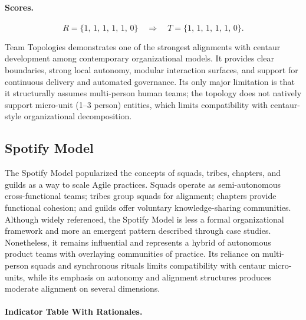 \documentclass[11pt, a4paper, twocolumn]{article} %
\begin{document}
\paragraph{Scores.}

\[
R = \{1,\,1,\,1,\,1,\,1,\,0\}
\quad\Rightarrow\quad
T = \{1,\,1,\,1,\,1,\,1,\,0\}.
\]

Team Topologies demonstrates one of the strongest alignments with centaur
development among contemporary organizational models. It provides clear
boundaries, strong local autonomy, modular interaction surfaces, and support for
continuous delivery and automated governance. Its only major limitation is that
it structurally assumes multi-person human teams; the topology does not
natively support micro-unit (1--3 person) entities, which limits compatibility
with centaur-style organizational decomposition.

\newpage
\subsection*{Spotify Model}

The Spotify Model popularized the concepts of squads, tribes, chapters, and
guilds as a way to scale Agile practices. Squads operate as semi-autonomous
cross-functional teams; tribes group squads for alignment; chapters provide
functional cohesion; and guilds offer voluntary knowledge-sharing communities.
Although widely referenced, the Spotify Model is less a formal organizational
framework and more an emergent pattern described through case studies.
Nonetheless, it remains influential and represents a hybrid of autonomous
product teams with overlaying communities of practice. Its reliance on
multi-person squads and synchronous rituals limits compatibility with centaur
micro-units, while its emphasis on autonomy and alignment structures produces
moderate alignment on several dimensions.

\paragraph{Indicator Table With Rationales.}
\end{document}
